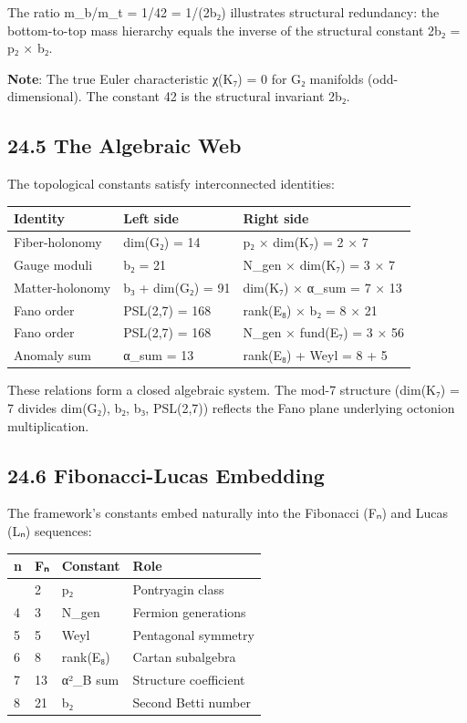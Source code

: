 \documentclass[11pt,a4paper]{article}
\begin{document}
The ratio m\_\allowbreak{}b/m\_\allowbreak{}t = 1/42 = 1/(2b₂) illustrates structural redundancy: the bottom-to-top mass hierarchy equals the inverse of the structural constant 2b₂ = p₂ × b₂.

\textbf{Note}: The true Euler characteristic χ(K₇) = 0 for G₂ manifolds (odd-dimensional). The constant 42 is the structural invariant 2b₂.

\subsection{24.5 The Algebraic Web}\label{the-algebraic-web}

The topological constants satisfy interconnected identities:

\begin{longtable}[]{@{}lll@{}}
\toprule\noalign{}
Identity & Left side & Right side \\
\midrule\noalign{}
\endhead
\bottomrule\noalign{}
\endlastfoot
Fiber-holonomy & dim(G₂) = 14 & p₂ × dim(K₇) = 2 × 7 \\
Gauge moduli & b₂ = 21 & N\_\allowbreak{}gen × dim(K₇) = 3 × 7 \\
Matter-holonomy & b₃ + dim(G₂) = 91 & dim(K₇) × α\_\allowbreak{}sum = 7 × 13 \\
Fano order & PSL(2,7) = 168 & rank(E₈) × b₂ = 8 × 21 \\
Fano order & PSL(2,7) = 168 & N\_\allowbreak{}gen × fund(E₇) = 3 × 56 \\
Anomaly sum & α\_\allowbreak{}sum = 13 & rank(E₈) + Weyl = 8 + 5 \\
\end{longtable}

These relations form a closed algebraic system. The mod-7 structure (dim(K₇) = 7 divides dim(G₂), b₂, b₃, PSL(2,7)) reflects the Fano plane underlying octonion multiplication.

\subsection{24.6 Fibonacci-Lucas Embedding}\label{fibonacci-lucas-embedding}

The framework's constants embed naturally into the Fibonacci (Fₙ) and Lucas (Lₙ) sequences:

\begin{longtable}[]{@{}llll@{}}
\toprule\noalign{}
n & Fₙ & Constant & Role \\
\midrule\noalign{}
\endhead
\bottomrule\noalign{}
\endlastfoot
3 & 2 & p₂ & Pontryagin class \\
4 & 3 & N\_\allowbreak{}gen & Fermion generations \\
5 & 5 & Weyl & Pentagonal symmetry \\
6 & 8 & rank(E₈) & Cartan subalgebra \\
7 & 13 & α²\_\allowbreak{}B sum & Structure coefficient \\
8 & 21 & b₂ & Second Betti number \\
\end{longtable}
\end{document}
